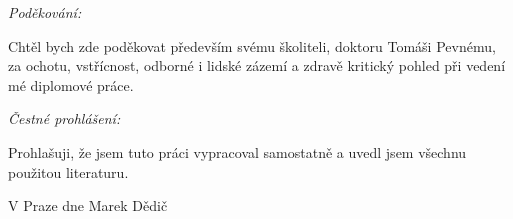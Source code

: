 \noindent \textit{\Large Poděkování:}

\noindent Chtěl bych zde poděkovat především svému školiteli, doktoru Tomáši Pevnému, za ochotu, vstřícnost, odborné i lidské zázemí a zdravě kritický pohled při vedení mé diplomové práce.

\vfill

\noindent \textit{\Large Čestné prohlášení:}

\noindent Prohlašuji, že jsem tuto práci vypracoval samostatně a uvedl
jsem všechnu použitou literaturu.

\bigskip

\noindent V Praze dne \documentdate\hfill Marek Dědič

\vspace{2cm}
